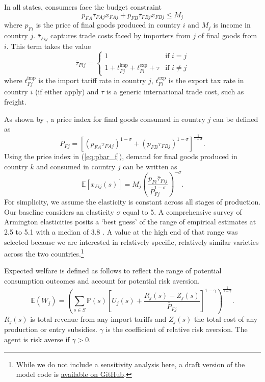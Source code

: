 \documentclass{article}
\begin{document}
In all states, consumers face the budget constraint 
\begin{equation}
    p_{FA} \bar{\tau}_{FAj} x_{FAj} + p_{FB} \bar{\tau}_{FBj} x_{FBj} \leq M_j
\end{equation}
where $p_{Fi}$ is the price of final goods produced in country $i$ and $M_j$ is income in country $j$. $\bar{\tau}_{Fij}$ captures trade costs faced by importers from $j$ of final goods from $i$. This term takes the value 
\begin{equation} \label{eq:tau}
    \bar{\tau}_{Fij} =
    \begin{cases}
        1 &\text{if } i = j \\
        1 + t^{\text{imp}}_{Fj} + t^{\text{exp}}_{Fi} + \tau &\text{if } i \neq j
    \end{cases}
\end{equation}
where $t^{\text{imp}}_{Fj}$ is the import tariff rate in country $j$, $t^{\text{exp}}_{Fi}$ is the export tax rate in country $i$ (if either apply) and $\tau$ is a generic international trade cost, such as freight.

As shown by \textcite{dixit_monopolistic_1977}, a price index for final goods consumed in country $j$ can be defined as
\begin{equation} \label{eq:pbar_f}
      \bar{P}_{Fj} = \left[ (p_{FA} \bar{\tau}_{FAj} )^{1-\sigma} +  (p_{FB} \bar{\tau}_{FBj})^{1-\sigma} \right]^\frac{1}{1-\sigma} .
\end{equation}
Using the price index in (\ref{eq:pbar_f}), demand for final goods produced in country $k$ and consumed in country $j$ can be written as
\begin{equation}
    \mathbb{E} \left[ x_{Fij}(s) \right] = M_j \left( \frac{p_{Fi} \bar{\tau}_{Fij}}{\bar{P}_{Fj}^{1 - \sigma}}  \right)^{-\sigma} .
\end{equation}
For simplicity, we assume the elasticity is constant across all stages of production. Our baseline considers an elasticity $\sigma$ equal to 5. A comprehensive survey of Armington elasticities posits a `best guess' of the range of empirical estimates at 2.5 to 5.1 with a median of 3.8 \parencite{bajzik_estimating_2020}. A value at the high end of that range was selected because we are interested in relatively specific, relatively similar varieties across the two countries.\footnote{While we do not include a sensitivity analysis here, a draft version of the model code is \href{https://github.com/sjhardwick/supply_chains}{available on GitHub}.}

Expected welfare is defined as follows to reflect the range of potential consumption outcomes and account for potential risk aversion.
\begin{equation} \label{eq:welfare}
    \mathbb{E} \left( W_j \right) = \left( \sum_{s \in S} \mathbb{P}(s) \left[ U_j(s) + \frac{R_j(s) - Z_j(s)}{\bar{P}_{Fj}} \right]^{1 - \gamma} \right)^{\frac{1}{1 - \gamma}} .
\end{equation}
$R_j(s)$ is total revenue from any import tariffs and $Z_j(s)$ the total cost of any production or entry subsidies. $\gamma$ is the coefficient of relative risk aversion. The agent is risk averse if $\gamma > 0$.
\end{document}

